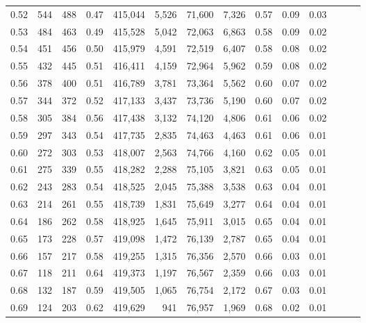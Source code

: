 \begin{tabular}{rrrrrrrrrrrrrr}
0.52 &     544 &    488 &  0.47 &  415,044 &    5,526 &  71,600 &   7,326 &  0.57 &  0.09 &      0.03 \\
0.53 &     484 &    463 &  0.49 &  415,528 &    5,042 &  72,063 &   6,863 &  0.58 &  0.09 &      0.02 \\
0.54 &     451 &    456 &  0.50 &  415,979 &    4,591 &  72,519 &   6,407 &  0.58 &  0.08 &      0.02 \\
0.55 &     432 &    445 &  0.51 &  416,411 &    4,159 &  72,964 &   5,962 &  0.59 &  0.08 &      0.02 \\
0.56 &     378 &    400 &  0.51 &  416,789 &    3,781 &  73,364 &   5,562 &  0.60 &  0.07 &      0.02 \\
0.57 &     344 &    372 &  0.52 &  417,133 &    3,437 &  73,736 &   5,190 &  0.60 &  0.07 &      0.02 \\
0.58 &     305 &    384 &  0.56 &  417,438 &    3,132 &  74,120 &   4,806 &  0.61 &  0.06 &      0.02 \\
0.59 &     297 &    343 &  0.54 &  417,735 &    2,835 &  74,463 &   4,463 &  0.61 &  0.06 &      0.01 \\
0.60 &     272 &    303 &  0.53 &  418,007 &    2,563 &  74,766 &   4,160 &  0.62 &  0.05 &      0.01 \\
0.61 &     275 &    339 &  0.55 &  418,282 &    2,288 &  75,105 &   3,821 &  0.63 &  0.05 &      0.01 \\
0.62 &     243 &    283 &  0.54 &  418,525 &    2,045 &  75,388 &   3,538 &  0.63 &  0.04 &      0.01 \\
0.63 &     214 &    261 &  0.55 &  418,739 &    1,831 &  75,649 &   3,277 &  0.64 &  0.04 &      0.01 \\
0.64 &     186 &    262 &  0.58 &  418,925 &    1,645 &  75,911 &   3,015 &  0.65 &  0.04 &      0.01 \\
0.65 &     173 &    228 &  0.57 &  419,098 &    1,472 &  76,139 &   2,787 &  0.65 &  0.04 &      0.01 \\
0.66 &     157 &    217 &  0.58 &  419,255 &    1,315 &  76,356 &   2,570 &  0.66 &  0.03 &      0.01 \\
0.67 &     118 &    211 &  0.64 &  419,373 &    1,197 &  76,567 &   2,359 &  0.66 &  0.03 &      0.01 \\
0.68 &     132 &    187 &  0.59 &  419,505 &    1,065 &  76,754 &   2,172 &  0.67 &  0.03 &      0.01 \\
0.69 &     124 &    203 &  0.62 &  419,629 &      941 &  76,957 &   1,969 &  0.68 &  0.02 &      0.01 \\

\end{tabular}
